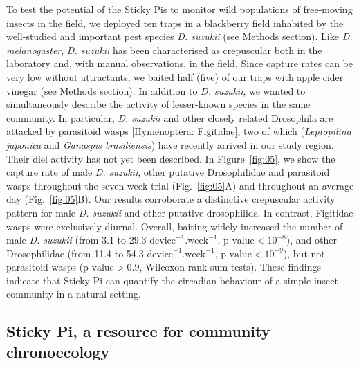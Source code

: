 \documentclass[fleqn,10pt]{wlscirep}
\begin{document}
To test the potential of the Sticky Pis to monitor wild populations of free-moving insects in the field, we deployed ten traps in a blackberry field inhabited by the well-studied and important pest species \emph{D. suzukii} (see Methods section). Like \emph{D. melanogaster}, \emph{D. suzukii} has been characterised as crepuscular both in the laboratory\cite{shaw_control_2019} and, with manual observations, in the field\cite{swoboda-bhattarai_diurnal_2020}. Since capture rates can be very low without attractants\cite{swoboda-bhattarai_diurnal_2020}, we baited half (five) of our traps with apple cider vinegar (see Methods section). In addition to \emph{D. suzukii}, we wanted to simultaneously describe the activity of lesser-known species in the same community. In particular, \emph{D. suzukii} and other closely related Drosophila are attacked by parasitoid wasps [Hymenoptera: Figitidae], two of which (\emph{Leptopilina japonica} and \emph{Ganaspis brasiliensis}) have recently arrived in our study region\cite{abram_new_2020}. Their diel activity has not yet been described. In Figure~\ref{fig:05}, we show the capture rate of male \emph{D. suzukii}, other putative Drosophilidae and parasitoid wasps throughout the seven-week trial (Fig.~\ref{fig:05}A) and throughout an average day (Fig.~\ref{fig:05}B). Our results corroborate a distinctive crepuscular activity pattern for male \emph{D. suzukii} and other putative drosophilids. In contrast, Figitidae wasps were exclusively diurnal. Overall, baiting widely increased the number of male \emph{D. suzukii} (from 3.1 to 29.3 $\text{device}^{-1}.\text{week}^{-1}$, $\text{p-value} < 10^{-8}$), and other Drosophilidae (from 11.4 to 54.3 $\text{device}^{-1}.\text{week}^{-1}$, $\text{p-value} < 10^{-9}$), but not parasitoid wasps ($\text{p-value} > 0.9$, Wilcoxon rank-sum tests). These findings indicate that Sticky Pi can quantify the circadian behaviour of a simple insect community in a natural setting.

\subsection*{Sticky Pi, a resource for community chronoecology}
\end{document}
